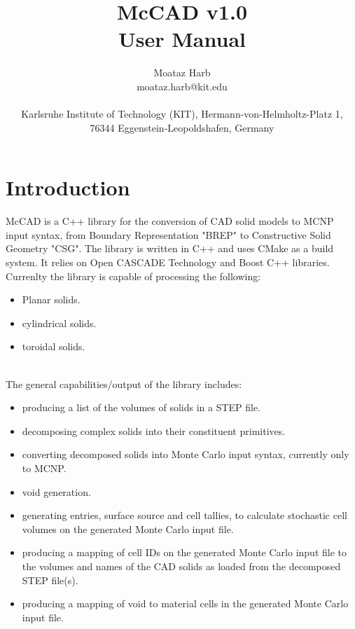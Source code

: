 \documentclass[letterpaper, 12 pt]{report}
\begin{document}
\title{McCAD v1.0\\User Manual}
\author{Moataz Harb\\ moataz.harb@kit.edu\\ \\Karlsruhe Institute of Technology (KIT), Hermann-von-Helmholtz-Platz 1,\\ 76344 Eggenstein-Leopoldshafen, Germany}
\maketitle
\pagestyle{empty}

\tableofcontents
\newpage

\section{Introduction} \label{sec:Introduction}
McCAD is a C++ library for the conversion of CAD solid models to MCNP input syntax, from Boundary Representation "BREP" to Constructive Solid Geometry "CSG". The library is written in C++ and uses CMake as a build system. It relies on Open CASCADE Technology and Boost C++ libraries. Currenlty the library is capable of processing the following:
\begin{itemize}
	\item Planar solids.
	\item cylindrical solids.
	\item toroidal solids.
\end{itemize}
\\
The general capabilities/output of the library includes:
\begin{itemize}
	\item producing a list of the volumes of solids in a STEP file.
	\item decomposing complex solids into their constituent primitives.
	\item converting decomposed solids into Monte Carlo input syntax, currently only to MCNP.
	\item void generation.
	\item generating entries, surface source and cell tallies, to calculate stochastic cell volumes on the generated Monte Carlo input file.
	\item producing a mapping of cell IDs on the generated Monte Carlo input file to the volumes and names of the CAD solids as loaded from the decomposed STEP file(s).
	\item producing a mapping of void to material cells in the generated Monte Carlo input file.
\end{itemize}
\end{document}
